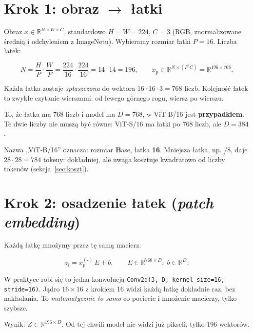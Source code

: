 \documentclass[11pt,a4paper]{article}
\begin{document}
\section{Krok 1: obraz $\to$ łatki}

Obraz $x\in\mathbb{R}^{H\times W\times C}$, standardowo $H=W=224$, $C=3$ (RGB, znormalizowane średnią
i odchyleniem z ImageNetu). Wybieramy rozmiar łatki $P=16$. Liczba łatek:
\begin{wzor}
\[
N=\frac{H}{P}\cdot\frac{W}{P}=\frac{224}{16}\cdot\frac{224}{16}=14\cdot14=196,
\qquad
x_p\in\mathbb{R}^{N\times(P^2C)}=\mathbb{R}^{196\times768}.
\]
\end{wzor}
Każda łatka zostaje \emph{spłaszczona} do wektora $16\cdot16\cdot3=768$ liczb. Kolejność łatek to
zwykłe czytanie wierszami: od lewego górnego rogu, wiersz po wierszu.

\begin{uwaga}
To, że łatka ma 768 liczb i model ma $D=768$, w ViT-B/16 jest \textbf{przypadkiem}. Te dwie liczby
nie muszą być równe: ViT-S/16 ma łatki po 768 liczb, ale $D=384$.
\end{uwaga}

Nazwa „ViT-B/16'' oznacza: rozmiar \textbf{B}ase, łatka \textbf{16}. Mniejsza łatka, np. /8, daje
$28\cdot28=784$ tokeny: dokładniej, ale uwaga kosztuje kwadratowo od liczby tokenów (sekcja~\ref{sec:koszt}).

\section{Krok 2: osadzenie łatek (\emph{patch embedding})}

Każdą łatkę mnożymy przez tę samą macierz:
\begin{wzor}
\[ z_i = x_p^{(i)}\,E + b,\qquad E\in\mathbb{R}^{768\times D},\; b\in\mathbb{R}^{D}. \]
\end{wzor}
W praktyce robi się to jedną konwolucją \texttt{Conv2d(3, D, kernel\_size=16, stride=16)}. Jądro
$16\times16$ z krokiem 16 widzi każdą łatkę dokładnie raz, bez nakładania. To \emph{matematycznie
to samo} co pocięcie i mnożenie macierzy, tylko szybsze.

Wynik: $Z\in\mathbb{R}^{196\times D}$. Od tej chwili model nie widzi już pikseli, tylko 196 wektorów.
\end{document}
